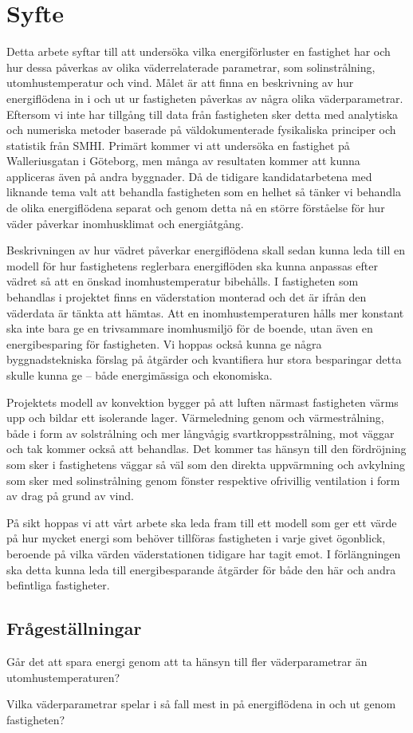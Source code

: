 \section{Syfte}
Detta arbete syftar till att undersöka vilka energiförluster en fastighet har och hur dessa 
påverkas av olika väderrelaterade parametrar, som solinstrålning, utomhustemperatur 
och vind. Målet är att finna en beskrivning av hur energiflödena in i och ut ur 
fastigheten påverkas av några olika väderparametrar. Eftersom vi inte har tillgång till data
 från fastigheten sker detta med analytiska och numeriska metoder baserade på 
väldokumenterade fysikaliska principer och statistik från SMHI. Primärt kommer vi att 
undersöka en fastighet på Walleriusgatan i Göteborg, men många av resultaten kommer 
att kunna appliceras även på andra byggnader. Då de tidigare kandidatarbetena med liknande tema valt att
behandla fastigheten som en helhet så tänker vi behandla de olika energiflödena separat
och genom detta nå en större förståelse för hur väder påverkar inomhusklimat och energiåtgång.

Beskrivningen av hur vädret påverkar energiflödena skall sedan kunna leda till en modell 
för hur fastighetens reglerbara energiflöden ska kunna anpassas efter vädret så att en 
önskad inomhustemperatur bibehålls. I fastigheten som behandlas i projektet finns
 en väderstation monterad och det är ifrån den väderdata är tänkta att hämtas. Att en inomhustemperaturen hålls mer konstant ska 
 inte bara ge en trivsammare inomhusmiljö för de boende, utan även en energibesparing 
 för fastigheten. Vi hoppas också kunna ge några byggnadstekniska förslag på åtgärder 
 och kvantifiera hur stora besparingar detta skulle kunna ge – både energimässiga och 
 ekonomiska.

Projektets modell av konvektion bygger på att luften närmast fastigheten värms upp och 
bildar ett isolerande lager. Värmeledning genom och värmestrålning, både i form av solstrålning och mer långvågig svartkroppsstrålning, mot väggar och tak kommer också att behandlas. Det kommer tas hänsyn till den fördröjning som 
sker i fastighetens väggar så väl som den direkta uppvärmning och avkylning som sker med 
solinstrålning genom fönster respektive ofrivillig ventilation i form av drag på grund av vind.

På sikt hoppas vi att vårt arbete ska leda fram till ett modell som ger ett värde på hur mycket energi som behöver tillföras fastigheten i varje givet ögonblick, beroende på vilka värden väderstationen tidigare har tagit emot. I förlängningen ska detta kunna leda till energibesparande åtgärder för både den här och andra befintliga fastigheter.

\subsection{Frågeställningar}
Går det att spara energi genom att ta hänsyn till fler väderparametrar än utomhustemperaturen?

Vilka väderparametrar spelar i så fall mest in på energiflödena in och ut genom fastigheten?
